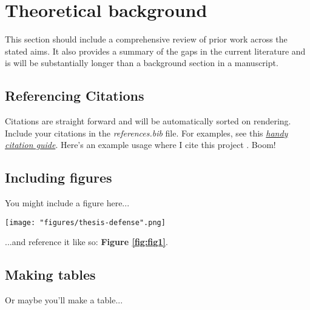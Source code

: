 \center

\section{Theoretical background}

\raggedright

This section should include a comprehensive review of prior work across the stated aims. It also provides a summary of the gaps in the current literature and is will be substantially longer than a background section in a manuscript.


\subsection{Referencing Citations}

Citations are straight forward and will be automatically sorted on rendering. Include your citations in the \textit{references.bib} file. For examples, see this  \textit{\href{https://libguides.nps.edu/citation/ieee-bibtex}{handy citation guide}}. Here's an example usage where I cite this project \cite{OHSU-overleaf-dissertation-template}. Boom!


\subsection{Including figures}

You might include a figure here...

\begin{figure*}
  \centering
  \texttt{[image: "figures/thesis-defense".png]}
  \caption{\textbf{The best thesis defense is a good thesis offense.} A conceptual illustration of the celebrated thesis \textit{offense}, an ambitious but often effective tactical maneuver.}
  \label{fig:fig1}
\end{figure*}

...and reference it like so: \textbf{Figure \ref{fig:fig1}}.


\subsection{Making tables}

Or maybe you'll make a table...

